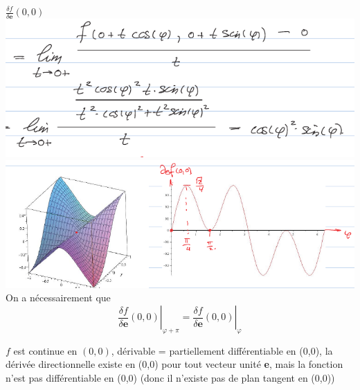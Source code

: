 \documentclass[12pt,a4paper]{article}
\begin{document}
$\frac{\delta f}{\delta \textbf{e}}(0,0)$\\ \includegraphics[scale=0.5]{images/suite_exemple}\\
\includegraphics[scale=0.5]{images/dessins_exemple}\\
 On a nécessairement que 
\begin{equation*}
	\left.\frac{\delta f}{\delta \textbf{e}}(0,0)\right|_{\varphi + \pi} = \left.\frac{\delta f}{\delta \textbf{e}}(0,0)\right|_{\varphi}
\end{equation*}
\begin{boite}
	 $f$ est continue en $(0,0)$, dérivable = partiellement différentiable en (0,0), la dérivée directionnelle existe en (0,0) pour tout vecteur unité \textbf{e}, mais la fonction n'est pas différentiable en (0,0) (donc il n'existe pas de plan tangent en (0,0))
\end{boite}
\end{document}
